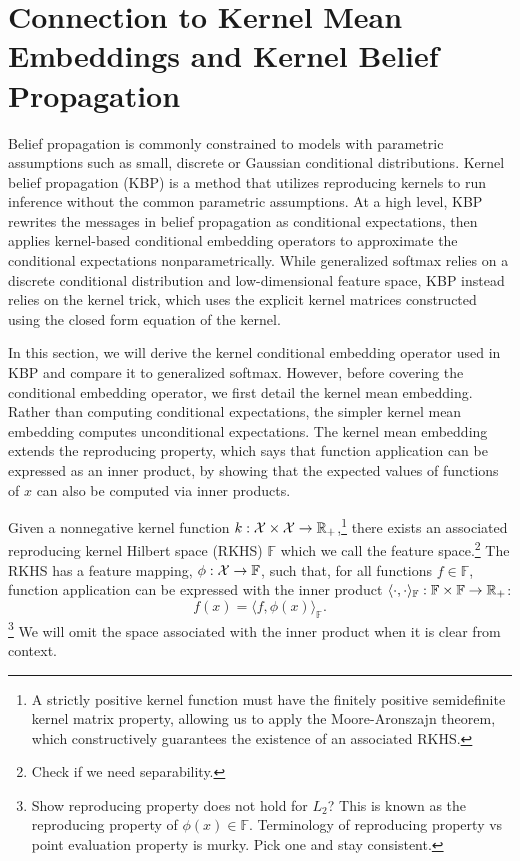 \documentclass{article}
\begin{document}
\section{Connection to Kernel Mean Embeddings and Kernel Belief Propagation}
Belief propagation is commonly constrained to models with parametric assumptions such as
small, discrete or Gaussian conditional distributions.
Kernel belief propagation (KBP) is a method that utilizes reproducing kernels
to run inference without the common parametric assumptions.
At a high level, KBP rewrites the messages in belief propagation as conditional
expectations, then applies kernel-based conditional embedding operators
to approximate the conditional expectations nonparametrically.
While generalized softmax relies on a discrete conditional distribution and low-dimensional
feature space, KBP instead relies on the kernel trick, which uses the explicit kernel
matrices constructed using the closed form equation of the kernel.

In this section, we will derive the kernel conditional embedding operator
used in KBP and compare it to generalized softmax.
However, before covering the conditional embedding operator, we first
detail the kernel mean embedding.
Rather than computing conditional expectations,
the simpler kernel mean embedding computes unconditional expectations.
The kernel mean embedding extends the reproducing property,
which says that function application can be expressed as an inner product,
by showing that the expected values of functions of $x$ can also
be computed via inner products.

Given a nonnegative kernel function $k:\mathcal{X}\times\mathcal{X}\to\mathbb{R}_+$,\footnote{
A strictly positive kernel function must have the finitely positive semidefinite
kernel matrix property, allowing us to apply the Moore-Aronszajn theorem,
which constructively guarantees the existence of an associated RKHS.
}
there exists an associated reproducing kernel Hilbert space (RKHS) $\mathbb{F}$
which we call the feature space.\footnote{
Check if we need separability.
}
The RKHS has a feature mapping, $\phi:\mathcal{X}\to\mathbb{F}$,
such that, for all functions $f\in\mathbb{F}$,
function application can be expressed with the inner product
$\langle\cdot,\cdot\rangle_\mathbb{F}:\mathbb{F}\times\mathbb{F}\to\mathbb{R}_+$:
$$f(x) = \langle f, \phi(x)\rangle_\mathbb{F}.$$
\footnote{
Show reproducing property does not hold for $L_2$?
This is known as the reproducing property of $\phi(x)\in\mathbb{F}$.
Terminology of reproducing property vs point evaluation property is murky.
Pick one and stay consistent.
}
We will omit the space associated with the inner product when it is clear from context.
\end{document}
